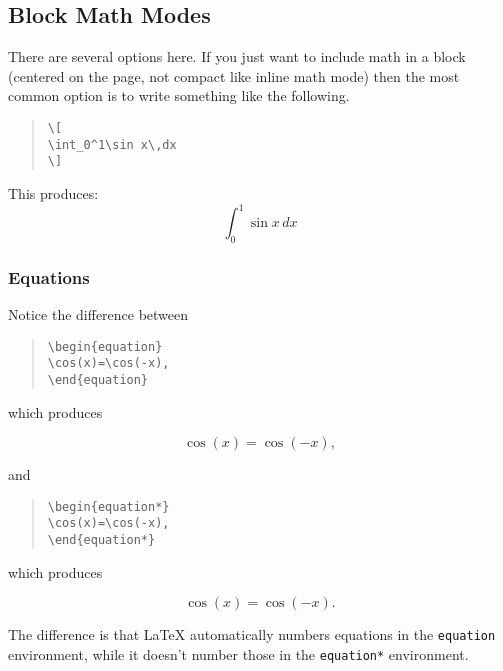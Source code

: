 \documentclass[letterpaper,twoside,10pt]{article}
\begin{document}
\subsection{Block Math Modes}

There are several options here. If you just want to include math in a block (centered on the page,
not compact like inline math mode) then the most common option is to write something like the
following.

\begin{quote}
\begin{verbatim}
\[
\int_0^1\sin x\,dx
\]
\end{verbatim}
\end{quote}

This produces:
\[
\int_0^1\sin x\,dx
\]

\subsubsection{Equations}

Notice the difference between

\begin{quote}
\begin{verbatim}
\begin{equation}
\cos(x)=\cos(-x),
\end{equation}
\end{verbatim}
\end{quote}

which produces

\begin{equation}
\cos(x)=\cos(-x),
\end{equation}

and 

\begin{quote}
\begin{verbatim}
\begin{equation*}
\cos(x)=\cos(-x),
\end{equation*}
\end{verbatim}
\end{quote}

which produces

\begin{equation*}
\cos(x)=\cos(-x).
\end{equation*}

The difference is that {\LaTeX} automatically numbers equations in the \verb!equation! environment,
while it doesn't number those in the \verb!equation*! environment.
\end{document}
